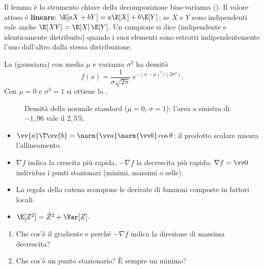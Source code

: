 Il lemma è lo strumento chiave della decomposizione bias-varianza (). Il valore atteso è
\textbf{lineare}: $\E[aX+bY] = a\E[X]+b\E[Y]$; se $X$ e $Y$ sono indipendenti vale anche $\E[XY]=\E[X]\,\E[Y]$.
Un campione si dice  (indipendente e identicamente distribuito) quando i suoi elementi sono
estratti indipendentemente l'uno dall'altro dalla stessa distribuzione.

\begin{definizione}
La  (gaussiana) con media $\mu$ e varianza $\sigma^2$ ha densità
\begin{equation}
f(x) = \frac{1}{\sigma\sqrt{2\pi}}\;e^{-(x-\mu)^2/(2\sigma^2)} .
\end{equation}
Con $\mu=0$ e $\sigma^2=1$ si ottiene la .
\end{definizione}

\begin{figure}[ht]
\centering
{}
\caption{Densità della normale standard ($\mu=0$, $\sigma=1$): l'area a sinistra di $-1{,}96$ vale il $2{,}5\%$.}
\label{fig:gaussiana}
\end{figure}

\begin{puntichiave}
\begin{itemize}
  \item $\vv{a}\T\vv{b} = \norm{\vv a}\norm{\vv b}\cos\theta$: il prodotto scalare misura l'allineamento.
  \item $\nabla f$ indica la crescita più rapida, $-\nabla f$ la decrescita più rapida; $\nabla f=\vv0$ individua
        i punti stazionari (minimi, massimi o selle).
  \item La regola della catena scompone le derivate di funzioni composte in fattori locali.
  \item $\E[Z^2] = \bar Z^2+\Var[Z]$.
\end{itemize}
\end{puntichiave}

\begin{domande}
\begin{enumerate}
  \item Che cos'è il gradiente e perché $-\nabla f$ indica la direzione di massima decrescita?
  \item Che cos'è un punto stazionario? È sempre un minimo?
\end{enumerate}
\end{domande}
